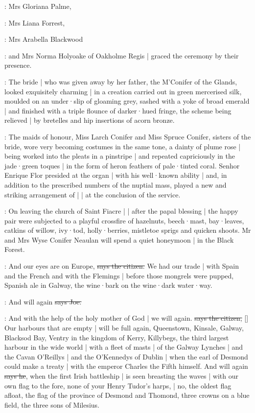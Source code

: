 :
Mrs Gloriana Palme,

:
Mrs Liana Forrest,

:
Mrs Arabella Blackwood

:
and Mrs Norma Holyoake of Oakholme Regis |
graced the ceremony by their presence.

:
The bride |
who was given away by her father,
the M'Conifer of the Glands,
looked exquisitely charming |
in a creation carried out in green mercerised silk,
moulded on an under·slip of gloaming grey,
sashed with a yoke of broad emerald |
and finished with a triple flounce of darker·hued fringe,
the scheme being relieved |
by bretelles and hip insertions of acorn bronze.

:
The maids of honour,
Miss Larch Conifer and Miss Spruce Conifer,
sisters of the bride,
wore very becoming costumes in the same tone,
a dainty  of plume rose |
being worked into the pleats in a pinstripe |
and repeated capriciously in the jade·green toques |
in the form of heron feathers of pale·tinted coral.
Senhor Enrique Flor presided at the organ |
with his well·known ability |
and,
in addition to the prescribed numbers of the nuptial mass,
played a new and striking arrangement of
 |
 |
at the conclusion of the service.

:
On leaving the church of Saint Fiacre |
 |
after the papal blessing |
the happy pair were subjected to a playful crossfire of hazelnuts,
beech·mast,
bay·leaves,
catkins of willow,
ivy·tod,
holly·berries,
mistletoe sprigs
and quicken shoots.
Mr and Mrs Wyse Conifer Neaulan will spend a quiet honeymoon |
in the Black Forest.

\citizen:
And our eyes are on Europe,
\sout{says the citizen.}
We had our trade |
with Spain and the French and with the Flemings |
before those mongrels were pupped,
Spanish ale in Galway,
the wine·bark on the wine·dark water·way.

\joe:
And will again
\sout{says Joe.}

\citizen:
And with the help of the holy mother of God |
we will again.
\sout{says the citizen,}
[]
Our harbours that are empty |
will be full again,
Queenstown,
Kinsale,
Galway,
Blacksod Bay,
Ventry in the kingdom of Kerry,
Killybegs,
the third largest harbour in the wide world |
with a fleet of masts |
of the Galway Lynches |
and the Cavan O'Reillys |
and the O'Kennedys of Dublin |
when the earl of Desmond
could make a treaty |
with the emperor Charles the Fifth himself.
And will again
\sout{says he},
when the first Irish battleship |
is seen breasting the waves |
with our own flag to the fore,
none of your Henry Tudor's harps, |
no,
the oldest flag afloat,
the flag of the province of Desmond and Thomond,
three crowns on a blue field,
the three sons of Milesius.%

